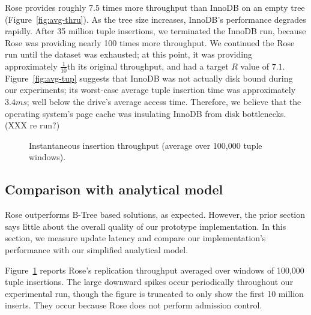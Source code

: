 \documentclass{vldb}
\newcommand{\rows}{Rose\xspace}
\newcommand{\rowss}{Rose's\xspace}
\begin{document}
\rows provides
roughly 7.5 times more throughput than InnoDB on an empty tree (Figure~\ref{fig:avg-thru}).  As the tree size
increases, InnoDB's performance degrades rapidly.  After 35 million
tuple insertions, we terminated the InnoDB run, because \rows was providing
nearly 100 times more throughput.  We continued the \rows run until
the dataset was exhausted; at this point, it was providing
approximately $\frac{1}{10}$th its original throughput, and had a
target $R$ value of $7.1$.  Figure~\ref{fig:avg-tup} suggests that
InnoDB was not actually disk bound during our experiments; its
worst-case average tuple insertion time was approximately $3.4 ms$;
well below the drive's average access time.  Therefore, we believe
that the operating system's page cache was insulating InnoDB from disk
bottlenecks. (XXX re run?)
\begin{figure}
\centering
{}
\caption{Instantaneous insertion throughput (average over 100,000 tuple windows).}
\label{fig:inst-thru}
\end{figure}


\subsection{Comparison with analytical model}

\rows outperforms B-Tree based solutions, as expected.  However, the
prior section says little about the overall quality of our prototype
implementation.  In this section, we measure update latency and compare
our implementation's performance with our simplified analytical model.

Figure~\ref{fig:inst-thru} reports \rowss replication throughput
averaged over windows of 100,000 tuple insertions.  The large downward
spikes occur periodically throughout our experimental run, though the
figure is truncated to only show the first 10 million inserts.  They
occur because \rows does not perform admission control.
\end{document}
